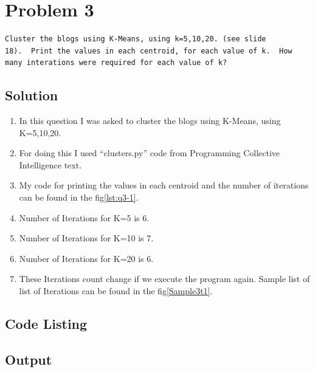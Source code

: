 \section{Problem 3}
\label{part3}
\begin{verbatim}
Cluster the blogs using K-Means, using k=5,10,20. (see slide
18).  Print the values in each centroid, for each value of k.  How
many interations were required for each value of k?

\end{verbatim}
\subsection{Solution}
\begin{enumerate}

\item In this question I was asked to cluster the blogs using K-Means, using K=5,10,20. 
\item For doing this I used ``clusters.py'' code from Programming Collective Intelligence text.
\item My code for printing the values in each centroid and the number of iterations can be found in the fig\ref{lst:q3-1}.
\item Number of Iterations for K=5 is 6.
\item Number of Iterations for K=10 is 7.
\item Number of Iterations for K=20 is 6.
\item These Iterations count change if we execute the program again. Sample list of list of Iterations can be found in the fig\ref{Sample3t1}.

\newpage
\end{enumerate}
\subsection{Code Listing}


\newpage

\subsection{Output}

